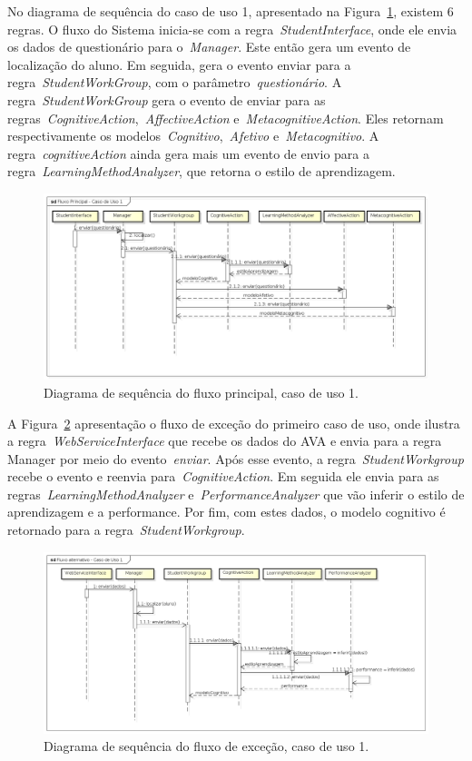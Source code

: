 No diagrama de sequência do caso de uso 1, apresentado na Figura~\ref{fig:dss-uc1-fluxo-principal}, existem 6 regras. O fluxo do Sistema inicia-se com a regra~\emph{StudentInterface}, onde ele envia os dados de questionário para o~\emph{Manager}. Este então gera um evento de localização do aluno. Em seguida, gera o evento enviar para a regra~\emph{StudentWorkGroup}, com o parâmetro~\emph{questionário}. A regra~\emph{StudentWorkGroup} gera o evento de enviar para as regras~\emph{CognitiveAction},~\emph{AffectiveAction} e~\emph{MetacognitiveAction}. Eles retornam respectivamente os modelos~\emph{Cognitivo},~\emph{Afetivo} e~\emph{Metacognitivo}. A regra~\emph{cognitiveAction} ainda gera mais um evento de envio para a regra~\emph{LearningMethodAnalyzer}, que retorna o estilo de aprendizagem.

\begin{figure}
	\centering
	\includegraphics[scale=0.42]{images/dss-uc1-fluxo-principal.png}
	\caption{Diagrama de sequência do fluxo principal, caso de uso 1.}
	\label{fig:dss-uc1-fluxo-principal}
\end{figure}

A Figura~\ref{fig:dss-uc1-fluxo-alternativo} apresentação o fluxo de exceção do primeiro caso de uso, onde ilustra a regra~\emph{WebServiceInterface} que recebe os dados do AVA e envia para a regra Manager por meio do evento~\emph{enviar}. Após esse evento, a regra~\emph{StudentWorkgroup} recebe o evento e reenvia para~\emph{CognitiveAction}. Em seguida ele envia para as regras~\emph{LearningMethodAnalyzer} e~\emph{PerformanceAnalyzer} que vão inferir o estilo de aprendizagem e a performance. Por fim, com estes dados, o modelo cognitivo é retornado para a regra~\emph{StudentWorkgroup}.

\begin{figure}
	\centering
	\includegraphics[scale=0.4]{images/dss-uc1-fluxo-alternativo}
	\caption{Diagrama de sequência do fluxo de exceção, caso de uso 1.}
	\label{fig:dss-uc1-fluxo-alternativo}
\end{figure}

